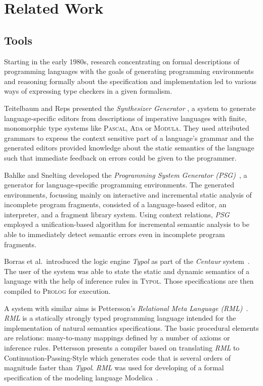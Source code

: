 \section{Related Work}

\subsection{Tools}

Starting in the early 1980s, research concentrating on formal
descriptions of programming languages with the goals of generating
programming environments and reasoning formally about the specification
and implementation led to various ways of expressing type checkers in
a given formalism.

Teitelbaum and Reps presented the \textit{Synthesizer Generator}
\cite{TeitelbaumReps81,RepsTeitelbaum89}, a system to generate
language-specific editors from descriptions of imperative languages
with finite, monomorphic type systems like \textsc{Pascal},
\textsc{Ada} or \textsc{Modula}. They used attributed grammars to
express the context sensitive part of a language's grammar and the
generated editors provided knowledge about the static semantics of the
language such that immediate feedback on errors could be given to the
programmer.

\bigskip

Bahlke and Snelting developed the \textit{Programming System Generator
  (PSG)}~\cite{BahlkeSnelting86}, a generator for language-specific
programming environments. The generated environments, focussing mainly
on interactive and incremental static analysis of incomplete program
fragments, consisted of a language-based editor, an interpreter, and a
fragment library system. Using context relations, \textit{PSG}
employed a unification-based algorithm for incremental semantic
analysis to be able to immediately detect semantic errors even in
incomplete program fragments.

\bigskip

Borras et al.~introduced the logic engine \textit{Typol} as part of
the \textit{Centaur} system~\cite{Borras88}. The user of the system
was able to state the static and dynamic semantics of a language with
the help of inference rules in \textsc{Typol}. Those specifications
are then compiled to \textsc{Prolog} for execution.

\bigskip

A system with similar aims is Pettersson's \textit{Relational Meta
  Language (RML)}~\cite{Pettersson1994}. \textit{RML} is a statically
strongly typed programming language intended for the implementation of
natural semantics specifications. The basic procedural elements are
relations: many-to-many mappings defined by a number of axioms or
inference rules. Pettersson presents a compiler based on translating
\textit{RML} to Continuation-Passing-Style which generates code that
is several orders of magnitude faster than \textit{Typol}.
\textit{RML} was used for developing of a formal specification of the
modeling language Modelica~\cite{Fritzson98}.

